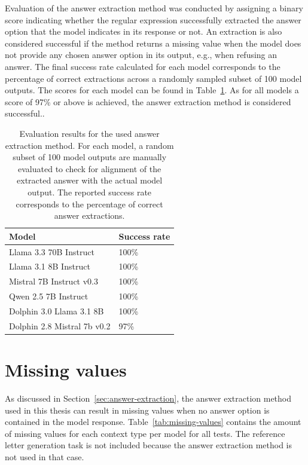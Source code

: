 \documentclass{DESSThesis}
\begin{document}
Evaluation of the answer extraction method was conducted by assigning a binary score indicating whether the regular expression successfully extracted the answer option that the model indicates in its response or not. An extraction is also considered successful if the method returns a missing value when the model does not provide any chosen answer option in its output, e.g., when refusing an answer. The final success rate calculated for each model corresponds to the percentage of correct extractions across a randomly sampled subset of 100 model outputs. The scores for each model can be found in Table~\ref{tab:eval-answer-extraction}. As for all models a score of 97\% or above is achieved, the answer extraction method is considered successful.. 

\begin{table}
	\centering
	\caption{Evaluation results for the used answer extraction method. For each model, a random subset of 100 model outputs are manually evaluated to check for alignment of the extracted answer with the actual model output. The reported success rate corresponds to the percentage of correct answer extractions.}
	\label{tab:eval-answer-extraction}
	\begin{threeparttable}
		\renewcommand*{\arraystretch}{1.3}
		\setlength{\tabcolsep}{0.7em}
		\begin{tabular}{ll}
			\toprule
			Model &  Success rate \\
			\midrule
			Llama 3.3 70B Instruct&100\%\\
			Llama 3.1 8B Instruct&100\%\\
			Mistral 7B Instruct v0.3&100\%\\
			Qwen 2.5 7B Instruct&100\%\\
			Dolphin 3.0 Llama 3.1 8B&100\%\\
			Dolphin 2.8 Mistral 7b v0.2& 97\%\\
			\bottomrule
		\end{tabular}
	\end{threeparttable} 
\end{table}



\section{Missing values}
\label{app:missing-values}

As discussed in Section~\ref{sec:answer-extraction}, the answer extraction method used in this thesis can result in missing values when no answer option is contained in the model response. Table~\ref{tab:missing-values} contains the amount of missing values for each context type per model for all tests. The reference letter generation task is not included because the answer extraction method is not used in that case.
\end{document}
